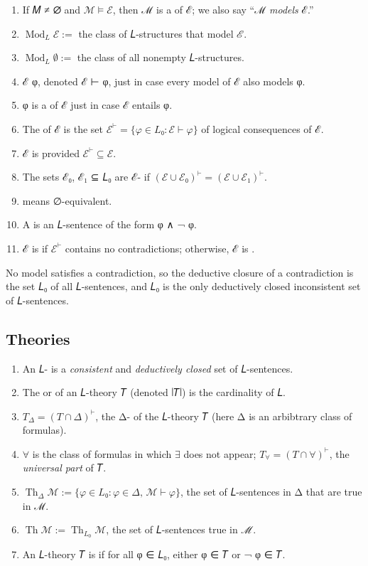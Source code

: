 \documentclass[a4paper,UKenglish,cleveref,autoref,thm-restate,12pt]{lipics-v2021-wjd}
\newcommand{\<}{\langle}
\renewcommand{\>}{\rangle}
\newcommand\bfall{\boldsymbol{\forall}}
\begin{document}
\begin{enumerate}
\item
  If 𝑀 ≠ ∅ and \(ℳ \models ℰ\), then ℳ is a  of ℰ; we also say
  ``ℳ \emph{models} ℰ.''
\item
  \(\operatorname{Mod}_L ℰ :=\) the class of 𝐿-structures that model ℰ.
\item
  \(\operatorname{Mod}_L ∅ :=\) the class of all nonempty 𝐿-structures.
\item
  ℰ  φ, denoted ℰ ⊢ φ, just in case every model of ℰ also models φ.
\item
  φ is a  of ℰ just in case ℰ entails φ.
\item
  The  of ℰ is the set \(ℰ^⊢ = \{φ ∈ 𝐿₀ : ℰ ⊢ φ\}\) of
  logical consequences of ℰ.
\item
  ℰ is  provided \(ℰ^⊢ ⊆ ℰ\).
\item
  The sets ℰ₀, ℰ₁ ⊆ 𝐿₀ are ℰ- if \((ℰ ∪ ℰ₀)^⊢ = (ℰ ∪ ℰ₁)^⊢\).
\item
   means ∅-equivalent.
\item
  A  is an 𝐿-sentence of the form φ ∧ ¬ φ.
\item
  ℰ is  if \(ℰ^⊢\) contains no contradictions; otherwise, ℰ is
  .
\end{enumerate}
\begin{remark*}
No model satisfies a contradiction, so the deductive closure of
a contradiction is the set 𝐿₀ of all 𝐿-sentences, and 𝐿₀ is the only deductively
closed inconsistent set of 𝐿-sentences.
\end{remark*}

\subsection{Theories}\label{theories}

\begin{enumerate}
\item
  An 𝐿- is a \emph{consistent} and \emph{deductively closed} set of
  𝐿-sentences.
\item
  The  or  of an 𝐿-theory 𝑇 (denoted ∣𝑇∣) is the cardinality of 𝐿.
\item
  \(T_Δ = (T ∩ Δ)^⊢\), the Δ- of the 𝐿-theory 𝑇 (here Δ is an
  arbibtrary class of formulas).
\item
  \(\bfall\) is the class of formulas in which \(\exists\) does not appear;
  \(T_{\bfall} = (T ∩ \bfall)^⊢\),  the \emph{universal part} of 𝑇.
\item
  \(\operatorname{Th}_Δ ℳ := \{φ ∈ 𝐿₀ : φ ∈ Δ, \, ℳ ⊢ φ\}\),
  the set of 𝐿-sentences in Δ that are true in ℳ.
\item
  \(\operatorname{Th} ℳ := \operatorname{Th}_{L_0} ℳ\),
  the set of 𝐿-sentences true in ℳ.
\item
  An 𝐿-theory 𝑇 is  if for all φ ∈ 𝐿₀, either φ ∈ 𝑇 or ¬ φ ∈ 𝑇.
\end{enumerate}
\end{document}
